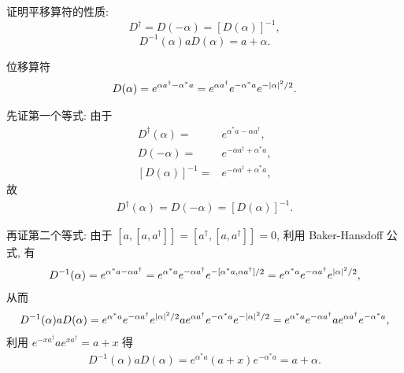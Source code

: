 \documentclass{assignment}
\begin{document}
\begin{prob}
    证明平移算符的性质:
    \[
        D^{\dagger}=D(-\alpha)=[D(\alpha)]^{-1},
    \]
    \[
        D^{-1}(\alpha)aD(\alpha)=a+\alpha.
    \]
\end{prob}
\begin{pf}
    位移算符
    \begin{align}
        D(\alpha)=e^{\alpha a^{\dagger}-\alpha^*a}=e^{\alpha a^{\dagger}}e^{-\alpha^*a}e^{-\left\lvert\alpha\right\rvert^2/2}.
    \end{align}

    先证第一个等式: 由于
    \begin{align}
        D^{\dagger}(\alpha)=&e^{\alpha^*a-\alpha a^{\dagger}},\\
        D(-\alpha)=&e^{-\alpha a^{\dagger}+\alpha^*a},\\
        [D(\alpha)]^{-1}=&e^{-\alpha a^{\dagger}+\alpha^*a},
    \end{align}
    故
    \begin{align}
        D^{\dagger}(\alpha)=D(-\alpha)=[D(\alpha)]^{-1}.
    \end{align}

    再证第二个等式: 由于 $[a,[a,a^{\dagger}]]=[a^{\dagger},[a,a^{\dagger}]]=0$, 利用 Baker-Hansdoff 公式, 有
    \begin{align}
        D^{-1}(\alpha)=e^{\alpha^*a-\alpha a^{\dagger}}=e^{\alpha^*a}e^{-\alpha a^{\dagger}}e^{-[\alpha^*a,\alpha a^{\dagger}]/2}=e^{\alpha^*a}e^{-\alpha a^{\dagger}}e^{\left\lvert\alpha\right\rvert^2/2},
    \end{align}
    从而
    \begin{align}
        D^{-1}(\alpha)aD(\alpha)=e^{\alpha^*a}e^{-\alpha a^{\dagger}}e^{\left\lvert\alpha\right\rvert^2/2}ae^{\alpha a^{\dagger}}e^{-\alpha^*a}e^{-\left\lvert\alpha\right\rvert^2/2}=e^{\alpha^*a}e^{-\alpha a^{\dagger}}ae^{\alpha a^{\dagger}}e^{-\alpha^*a},
    \end{align}
    利用 $e^{-xa^{\dagger}}ae^{xa^{\dagger}}=a+x$ 得
    \begin{align}
        D^{-1}(\alpha)aD(\alpha)=e^{\alpha^*a}(a+x)e^{-\alpha^*a}=a+\alpha.
    \end{align}
\end{pf}
\end{document}
